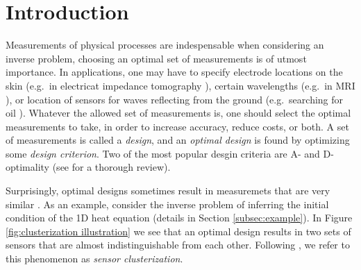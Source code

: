 \section{Introduction}\label{section:OED intro}
Measurements of physical processes are indespensable when considering
an inverse problem, choosing an optimal set of measurements is of
utmost importance. In applications, one may have to specify electrode
locations on the skin (e.g.\ in electricat impedance tomography
\cite{horesh2010impedance}), certain wavelengths (e.g.\ in MRI
\cite{horesh2008mri}), or location of sensors for waves reflecting
from the ground (e.g.\ searching for oil
\cite{horesh2008borehole}). Whatever the allowed set of measurements
is, one should select the optimal measurements to take, in order to
increase accuracy, reduce costs, or both. A set of measurements is
called a \emph{design}, and an \emph{optimal design} is found by
optimizing some \emph{design criterion}. Two of the most popular
desgin criteria are A- and D-optimality (see \cite{Chaloner1995} for a
thorough review).

Surprisingly, optimal designs sometimes result in measuremets that are
very similar \cite{fedorov1996, hooker2009, fedorov2012, Ucinski05,
  neitzel2019sparse}. As an example, consider the inverse problem of
inferring the initial condition of the 1D heat equation (details in
Section \ref{subsec:example}). In Figure \ref{fig:clusterization
  illustration} we see that an optimal design results in two sets of
sensors that are almost indistinguishable from each other. Following
\cite{Ucinski05}, we refer to this phenomenon as \emph{sensor
clusterization}.

